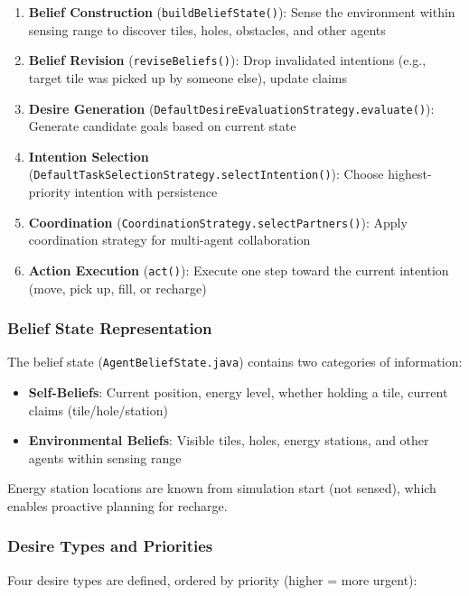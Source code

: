 \documentclass[titlepage=formal,code=listings,logo=../../assets/火炬+英文校名-左右.pdf]{../../SUSTechHomework}
\begin{document}
\begin{enumerate}
  \item \textbf{Belief Construction} (\texttt{buildBeliefState()}): Sense the environment within sensing range to discover tiles, holes, obstacles, and other agents
  \item \textbf{Belief Revision} (\texttt{reviseBeliefs()}): Drop invalidated intentions (e.g., target tile was picked up by someone else), update claims
  \item \textbf{Desire Generation} (\texttt{DefaultDesireEvaluationStrategy.evaluate()}): Generate candidate goals based on current state
  \item \textbf{Intention Selection} (\texttt{DefaultTaskSelectionStrategy.selectIntention()}): Choose highest-priority intention with persistence
  \item \textbf{Coordination} (\texttt{CoordinationStrategy.selectPartners()}): Apply coordination strategy for multi-agent collaboration
  \item \textbf{Action Execution} (\texttt{act()}): Execute one step toward the current intention (move, pick up, fill, or recharge)
\end{enumerate}

\subsubsection{Belief State Representation}

The belief state (\texttt{AgentBeliefState.java}) contains two categories of information:

\begin{itemize}
  \item \textbf{Self-Beliefs}: Current position, energy level, whether holding a tile, current claims (tile/hole/station)
  \item \textbf{Environmental Beliefs}: Visible tiles, holes, energy stations, and other agents within sensing range
\end{itemize}

Energy station locations are known from simulation start (not sensed), which enables proactive planning for recharge.

\subsubsection{Desire Types and Priorities}

Four desire types are defined, ordered by priority (higher = more urgent):
\end{document}
